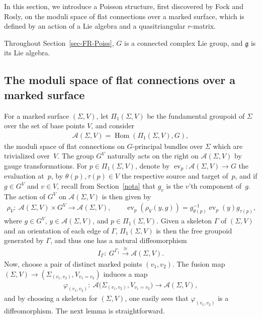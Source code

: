 \documentclass[pdftex]{sigma}
\numberwithin{equation}{section}
\def \g {\mathfrak{a}}
\def \g {\mathfrak{g}}
\def \A {{\mathcal{A}}}
\DeclareMathOperator{\Hom}{Hom}
\def \sV {{\scriptscriptstyle V}}
\begin{document}
In this section, we introduce a Poisson structure, f\/irst discovered by Fock and Rosly, on the moduli space of f\/lat connections over a marked surface, which is def\/ined by an action of a Lie algebra and a quasitriangular $r$-matrix.

Throughout Section~\ref{sec-FR-Poiss}, $G$ is a connected complex Lie group, and $\g$ is its Lie algebra.

\subsection{The moduli space of f\/lat connections over a marked surface} \label{subsec-moduli}

For a marked surface $(\Sigma, V)$, let $\Pi_1(\Sigma, V)$ be the fundamental groupoid of $\Sigma$ over the set of base points $V$, and consider
\begin{gather*}
\A(\Sigma, V) = \Hom(\Pi_1(\Sigma, V), G),
\end{gather*}
the moduli space of f\/lat connections on $G$-principal bundles over $\Sigma$ which are trivialized over~$V$. The group $G^V$ naturally acts on the right on $\A(\Sigma, V)$ by gauge transformations. For $p \in \Pi_1(\Sigma, V)$, denote by $\operatorname{ev}_p\colon \A(\Sigma, V) \to G$ the evaluation at~$p$, by $\theta(p), \tau(p) \in V$ the respective source and target of~$p$, and if $g \in G^V$ and $v \in V$, recall from Section~\ref{nota} that $g_v$ is the $v$'th component of~$g$. The action of $G^V$ on $\A(\Sigma, V)$ is then given by
\begin{gather}
\rho_{\sV}\colon \ \A(\Sigma, V) \times G^V \to \A(\Sigma, V), \qquad \operatorname{ev}_p(\rho_{\sV}(y, g)) = g_{\theta(p)}^{-1} \operatorname{ev}_p(y) g_{\tau(p)}, \label{lambda}
\end{gather}
where $g \in G^V$, $y \in \A(\Sigma, V)$, and $p \in \Pi_1(\Sigma, V)$. Given a skeleton $\Gamma$ of $(\Sigma, V)$ and an orientation of each edge of $\Gamma$, $\Pi_1(\Sigma, V)$ is then the free groupoid generated by $\Gamma$, and thus one has a natural dif\/feomorphism
\begin{gather}
I_{\Gamma}\colon \ G^{\Gamma_1} \stackrel{\cong}{\longrightarrow} \A(\Sigma, V). \label{orient-edge}
\end{gather}
Now, choose a pair of distinct marked points $(v_1, v_2)$. The fusion map $(\Sigma, V) \to (\Sigma_{(v_1, v_2)}, V_{v_1= v_2})$ induces a map
\begin{gather}
\varphi_{(v_1, v_2)}\colon \ \A\big(\Sigma_{(v_1, v_2)}, V_{v_1= v_2}\big) \longrightarrow \A(\Sigma, V), \label{varphi_v_1,v_2}
\end{gather}
and by choosing a skeleton for $(\Sigma, V)$, one easily sees that $\varphi_{(v_1, v_2)}$ is a dif\/feomorphism. The next lemma is straightforward.
\end{document}

